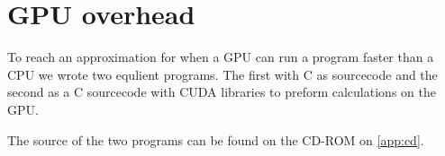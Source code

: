 \chapter{GPU overhead}
\label{app:gpuoverhead}
To reach an approximation for when a GPU can run a program faster than a CPU  we wrote two equlient programs.
The first with C as sourcecode and the second as a C sourcecode with CUDA libraries to preform calculations on the GPU.

The source of the two programs can be found on the CD-ROM on \ref{app:cd}.